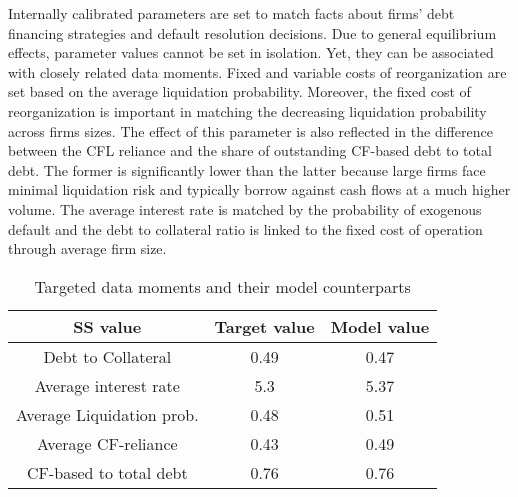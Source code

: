 \documentclass[12pt]{article}
\begin{document}
\noindent Internally calibrated parameters are set to match facts about firms' debt financing strategies and default resolution decisions. Due to general equilibrium effects, parameter values cannot be set in isolation. Yet, they can be associated with closely related data moments. Fixed and variable costs of reorganization are set based on the average liquidation probability. Moreover, the fixed cost of reorganization is important in matching the decreasing liquidation probability across firms sizes. The effect of this parameter is also reflected in the difference between the CFL reliance and the share of outstanding CF-based debt to total debt. The former is significantly lower than the latter because large firms face minimal liquidation risk and typically borrow against cash flows at a much higher volume. The average interest rate is matched by the probability of exogenous default and the debt to collateral ratio is linked to the fixed cost of operation through average firm size. 

\begin{table}[h!]
    \centering
    \begin{tabular}{c|c|c}
    \toprule
    \textbf{SS value} & \textbf{Target value} & \textbf{Model value} \\ 
    \midrule
    Debt to Collateral & 0.49 & 0.47 \\ 
    Average interest rate & 5.3 & 5.37 \\ 
    Average Liquidation prob. & 0.48 & 0.51 \\ 
    Average CF-reliance & 0.43 & 0.49 \\ 
   CF-based to total debt & 0.76 & 0.76 \\ 
    \bottomrule
    \end{tabular}
    \caption{Targeted data moments and their model counterparts}
    \label{tab:targets}
\end{table}
\end{document}
